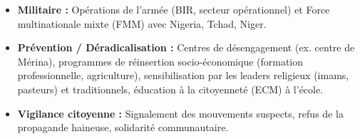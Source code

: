 \documentclass[11pt]{article}
\begin{document}
\begin{methode}
\begin{enumerate}
\begin{itemize}
\item \textbf{Militaire :} Opérations de l'armée (BIR, secteur opérationnel) et Force multinationale mixte (FMM) avec Nigeria, Tchad, Niger.
\item \textbf{Prévention / Déradicalisation :} Centres de désengagement (ex. centre de Mérina), programmes de réinsertion socio-économique (formation professionnelle, agriculture), sensibilisation par les leaders religieux (imams, pasteurs) et traditionnels, éducation à la citoyenneté (ECM) à l'école.
\item \textbf{Vigilance citoyenne :} Signalement des mouvements suspects, refus de la propagande haineuse, solidarité communautaire.
\end{itemize}
\end{enumerate}
\end{methode}
\end{document}
